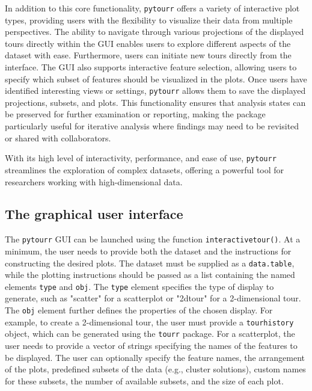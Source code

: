\documentclass[article]{ajs}
\begin{document}
In addition to this core functionality, \texttt{pytourr} offers a variety of interactive plot types, providing users with the flexibility to visualize their data from multiple perspectives. The ability to navigate through various projections of the displayed tours directly within the GUI enables users to explore different aspects of the dataset with ease. Furthermore, users can initiate new tours directly from the interface. The GUI also supports interactive feature selection, allowing users to specify which subset of features should be visualized in the plots. Once users have identified interesting views or settings, \texttt{pytourr} allows them to save the displayed projections, subsets, and plots. This functionality ensures that analysis states can be preserved for further examination or reporting, making the package particularly useful for iterative analysis where findings may need to be revisited or shared with collaborators.

With its high level of interactivity, performance, and ease of use, \texttt{pytourr} streamlines the exploration of complex datasets, offering a powerful tool for researchers working with high-dimensional data.


\subsection{The graphical user interface}

The \texttt{pytourr} GUI can be launched using the function \texttt{interactive\textunderscore tour()}. At a minimum, the user needs to provide both the dataset and the instructions for constructing the desired plots. The dataset must be supplied as a \texttt{data.table}, while the plotting instructions should be passed as a list containing the named elements \texttt{type} and \texttt{obj}. The \texttt{type} element specifies the type of display to generate, such as "scatter" for a scatterplot or "2d\textunderscore tour" for a 2-dimensional tour. The \texttt{obj} element further defines the properties of the chosen display. For example, to create a 2-dimensional tour, the user must provide a \texttt{tour\textunderscore history} object, which can be generated using the \texttt{tourr} package. For a scatterplot, the user needs to provide a vector of strings specifying the names of the features to be displayed. The user can optionally specify the feature names, the arrangement of the plots, predefined subsets of the data (e.g., cluster solutions), custom names for these subsets, the number of available subsets, and the size of each plot.
\end{document}
